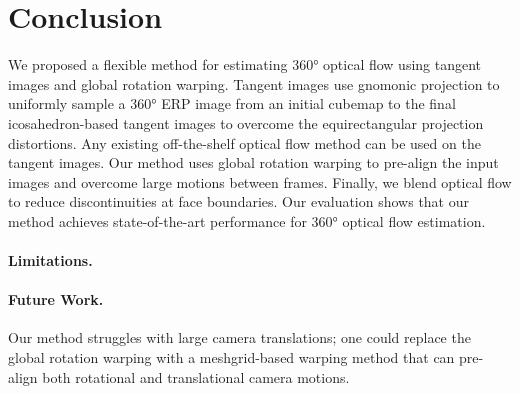 \section{Conclusion}

We proposed a flexible method for estimating 360° optical flow using tangent images and global rotation warping.
%
Tangent images use gnomonic projection to uniformly sample a 360° ERP image from an initial cubemap to the final icosahedron-based tangent images to overcome the equirectangular projection distortions.
Any existing off-the-shelf optical flow method can be used on the tangent images.
%
Our method uses global rotation warping to pre-align the input images and overcome large motions between frames.
Finally, we blend optical flow to reduce discontinuities at face boundaries.
%
Our evaluation shows that our method achieves state-of-the-art performance for 360° optical flow estimation.




\paragraph{Limitations.}


\paragraph{Future Work.}
%
Our method struggles with large camera translations; one could replace the global rotation warping with a meshgrid-based warping method that can pre-align both rotational and translational camera motions.


